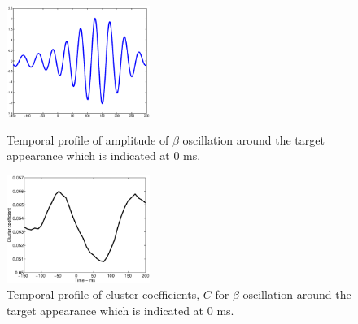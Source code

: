 \documentclass[letterpaper, 9pt, conference]{ieeeconf}
\begin{document}
\begin{figure}[ht!]
\begin{minipage}{10pc}
\includegraphics[width=11pc]{betaAMP.eps}
\caption{\label{label}Temporal profile of amplitude of $\beta$ oscillation around the target appearance which is indicated at $0$ ms.}
\end{minipage}\hspace{2pc}
\begin{minipage}{10pc}
\includegraphics[width=11pc]{betaCCMean.eps}
\caption{\label{label}Temporal profile of cluster coefficients, $C$ for $\beta$ oscillation around the target appearance which is indicated at $0$ ms.}
\end{minipage}\hspace{2pc}

\end{figure}
\end{document}
